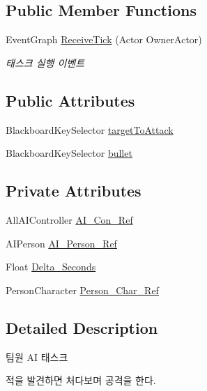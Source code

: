 \subsection*{Public Member Functions}
\begin{DoxyCompactItemize}
\item 
Event\+Graph \hyperlink{class_task___attack_a9093d054c58b6776e0d22b19740e499e}{Receive\+Tick} (Actor Owner\+Actor)
\begin{DoxyCompactList}\small\item\em 태스크 실행 이벤트 \end{DoxyCompactList}\end{DoxyCompactItemize}
\subsection*{Public Attributes}
\begin{DoxyCompactItemize}
\item 
Blackboard\+Key\+Selector \hyperlink{class_task___attack_a5db15eddb1295f044e175cfc5bd91112}{target\+To\+Attack}
\item 
Blackboard\+Key\+Selector \hyperlink{class_task___attack_aa168031a43b567fd2d207106c3c409fc}{bullet}
\end{DoxyCompactItemize}
\subsection*{Private Attributes}
\begin{DoxyCompactItemize}
\item 
All\+A\+I\+Controller \hyperlink{class_task___attack_abadbd5bcbf92ba0c69048da439a90cfa}{A\+I\+\_\+\+Con\+\_\+\+Ref}
\item 
A\+I\+Person \hyperlink{class_task___attack_a8114a9c0379628c81ab913d35ada8285}{A\+I\+\_\+\+Person\+\_\+\+Ref}
\item 
Float \hyperlink{class_task___attack_a5cd1d1666bf06427a520d6d06091d17e}{Delta\+\_\+\+Seconds}
\item 
Person\+Character \hyperlink{class_task___attack_a94a79dfe17324dd10cff48a241a1ea51}{Person\+\_\+\+Char\+\_\+\+Ref}
\end{DoxyCompactItemize}


\subsection{Detailed Description}
팀원 AI 태스크 

적을 발견하면 처다보며 공격을 한다. 

